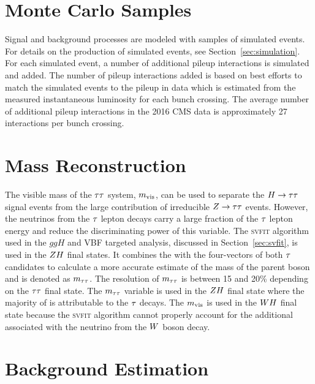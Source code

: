 \section{Monte Carlo Samples}
\label{sec:vh_mc_samples}
Signal and background processes are modeled with samples of simulated events.
For details on the production of simulated events, see Section~\ref{sec:simulation}.
For each simulated event, a number of additional pileup interactions is simulated and added. 
The number of pileup interactions added is based on best efforts to match the simulated
events to the pileup in data which is estimated from the measured instantaneous
luminosity for each bunch crossing. The average number of additional pileup interactions in
the 2016 CMS data is approximately 27 interactions per bunch crossing.



\section{Mass Reconstruction}
The visible mass of the $\tau\tau$ system, $m_\text{vis}$, can be used to separate
the $H\to\tau\tau$ signal events
from the large contribution of irreducible $Z \to \tau \tau$ events.
However, the neutrinos from the $\tau$ lepton decays carry a large fraction of
the $\tau$ lepton energy and reduce the discriminating power of this variable.
The \textsc{svfit} algorithm used in the $ggH$ and VBF targeted analysis,
discussed in Section~\ref{sec:svfit}, is used in the $ZH$ final states.
It combines the \etvecmiss 
with the four-vectors of both $\tau$ candidates to calculate a more accurate 
estimate of the mass of the parent boson and is denoted as $m_{\tau\tau}$. The resolution 
of $m_{\tau\tau}$ is between 15 and 20\% depending on the $\tau\tau$ final state. The 
$m_{\tau\tau}$ variable is used in the $ZH$ final state where the majority of 
\etvecmiss is attributable to the $\tau$ decays. The $m_\text{vis}$ is used in the 
$WH$ final state because the \textsc{svfit} algorithm cannot properly account for the 
additional \etvecmiss associated with the neutrino from the $W$ boson decay. 



\section{Background Estimation}
\label{sec:vh_background_estimation}

